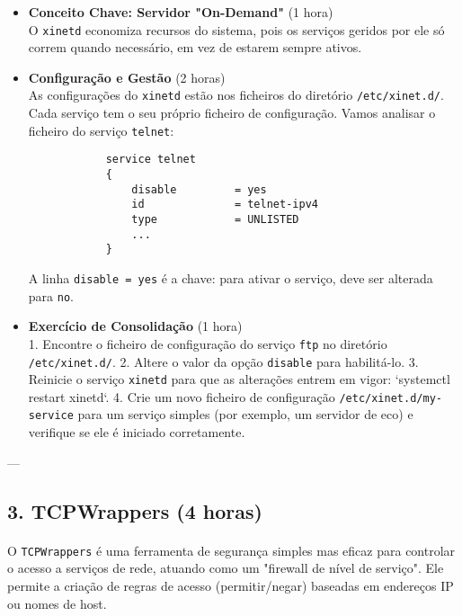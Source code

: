 \documentclass[10pt,a4paper]{article}
\begin{document}
	\begin{itemize}
		\item \textbf{Conceito Chave: Servidor "On-Demand"} (1 hora) \\
		O \texttt{xinetd} economiza recursos do sistema, pois os serviços geridos por ele só correm quando necessário, em vez de estarem sempre ativos.
		
		\item \textbf{Configuração e Gestão} (2 horas) \\
		As configurações do \texttt{xinetd} estão nos ficheiros do diretório \texttt{/etc/xinet.d/}. Cada serviço tem o seu próprio ficheiro de configuração. Vamos analisar o ficheiro do serviço \texttt{telnet}:
		\begin{verbatim}
			service telnet
			{
				disable         = yes
				id              = telnet-ipv4
				type            = UNLISTED
				...
			}
		\end{verbatim}
		A linha \texttt{disable = yes} é a chave: para ativar o serviço, deve ser alterada para \texttt{no}.
		
		\item \textbf{Exercício de Consolidação} (1 hora) \\
		1. Encontre o ficheiro de configuração do serviço \texttt{ftp} no diretório \texttt{/etc/xinet.d/}.
		2. Altere o valor da opção \texttt{disable} para habilitá-lo.
		3. Reinicie o serviço \texttt{xinetd} para que as alterações entrem em vigor: `systemctl restart xinetd`.
		4. Crie um novo ficheiro de configuração \texttt{/etc/xinet.d/my-service} para um serviço simples (por exemplo, um servidor de eco) e verifique se ele é iniciado corretamente.
	\end{itemize}
	
	---
	
	\subsection*{3. TCPWrappers (4 horas)}
	\vspace{-1.2em}
	\paragraph{}
	O \texttt{TCPWrappers} é uma ferramenta de segurança simples mas eficaz para controlar o acesso a serviços de rede, atuando como um "firewall de nível de serviço". Ele permite a criação de regras de acesso (permitir/negar) baseadas em endereços IP ou nomes de host.
	
\end{document}
